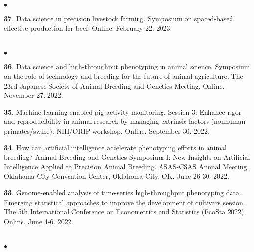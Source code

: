 \documentclass[margin,line,10pt]{res}
\newenvironment{list2}{
  \begin{list}{$\bullet$}{%
      \setlength{\itemsep}{0in}
      \setlength{\parsep}{0in} \setlength{\parskip}{0in}
      \setlength{\topsep}{0in} \setlength{\partopsep}{0in} 
      \setlength{\leftmargin}{0.2in}}}{\end{list}}
\begin{document}
\begin{resume}
\begin{list2}
  \vspace{0.5cm}

  \item [{\bf 37}.] Data science in precision livestock farming. Symposium on spaced-based effective production for beef. Online. February 22. 2023.

\end{list2}



\section{}
\begin{list2}
  

\item [{\bf 36}.] Data science and high-throughput phenotyping in animal science. Symposium on the role of technology and breeding for the future of animal agriculture. The 23rd Japanese Society of Animal Breeding and Genetics Meeting. Online. November 27. 2022. 

\vspace{0.5cm}

\item [{\bf 35}.] Machine learning-enabled pig activity monitoring. Session 3: Enhance rigor and reproducibility in animal research by managing extrinsic factors (nonhuman primates/swine). NIH/ORIP workshop. Online. September 30. 2022.

\vspace{0.5cm}

\item [{\bf 34}.] How can artificial intelligence accelerate phenotyping efforts in animal breeding? Animal Breeding and Genetics Symposium I: New Insights on Artificial Intelligence Applied to Precision Animal Breeding. ASAS-CSAS Annual Meeting. Oklahoma City Convention Center, Oklahoma City, OK. June 26-30. 2022.

\vspace{0.5cm}


\item [{\bf 33}.] Genome-enabled analysis of time-series high-throughput phenotyping data. Emerging statistical approaches to improve the development of cultivars session. The 5th International Conference on Econometrics and Statistics (EcoSta 2022). Online. June 4-6. 2022.

  
\end{list2}



\section{}
\begin{list2}


\end{list2}
\end{resume}
\end{document}
